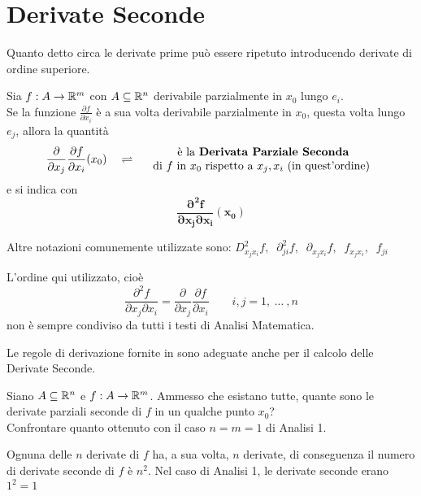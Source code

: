 \newpage
\section{Derivate Seconde}
Quanto detto circa le derivate prime può essere ripetuto introducendo derivate di ordine superiore.
\begin{definition}
	Sia $f: A \to \mathbb{R}^m$ con $A \subseteq \mathbb{R}^n$ derivabile parzialmente in $x_0$ lungo $e_i$.\\
	Se la funzione $\frac{\partial f}{\partial x_i}$ è a sua volta derivabile parzialmente in $x_0$, questa volta lungo $e_j$, allora la quantità
	\[
		\frac{\partial}{\partial x_j} \frac{\partial f}{\partial x_i} (x_0)
		\quad \rightleftharpoons \quad
		\begin{array}{c}
			\text{ è la \textbf{Derivata Parziale Seconda}}\\
			\text{di } f \text{ in } x_0 \text{ rispetto a } x_j, x_i \text{ (in quest'ordine)}
		\end{array}
	\]
	e si indica con
	\[\boldsymbol{\frac{\partial^2 f}{\partial x_j \partial x_i} (x_0)}\]
	\vspace*{-\baselineskip}
	\begin{note}
		Altre notazioni comunemente utilizzate sono: $D^2_{x_j x_i} f ,\;\; \partial^2_{ji} f ,\;\; \partial_{x_j x_i} f ,\;\; f_{x_j x_i} ,\;\; f_{ji}$
	\end{note}
	\begin{note}
		L'ordine qui utilizzato, cioè
		\[\frac{\partial^2 f}{\partial x_j \partial x_i} = \frac{\partial}{\partial x_j} \frac{\partial f}{\partial x_i} \qquad i,j = 1,\:\dotsc\:,n\]
		non è sempre condiviso da tutti i testi di Analisi Matematica.
	\end{note}
\end{definition}
\begin{observation}
	Le regole di derivazione fornite in  sono adeguate anche per il calcolo delle Derivate Seconde.
\end{observation}
\begin{exercise}
	\label{ex:num_deriv_sec}
	Siano $A \subseteq \mathbb{R}^n$ e $f:A \to \mathbb{R}^m$. Ammesso che esistano tutte, quante sono le derivate parziali seconde di $f$ in un qualche punto $x_0$?\\
	Confrontare quanto ottenuto con il caso $n = m = 1$ di Analisi 1.
	\begin{solution}
		Ognuna delle $n$ derivate di $f$ ha, a sua volta, $n$ derivate, di conseguenza il numero di derivate seconde di $f$ è $n^2$. Nel caso di Analisi 1, le derivate seconde erano $1^2 = 1$
	\end{solution}
\end{exercise}

